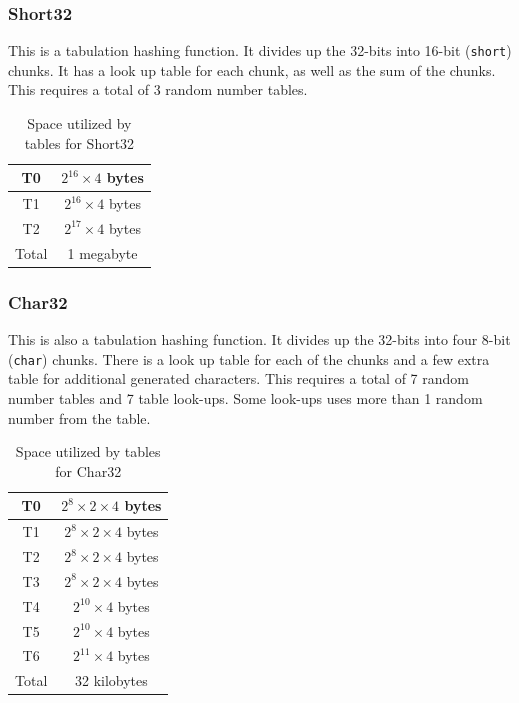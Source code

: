 \documentclass[11pt]{article}
\begin{document}
\subsubsection{Short32}
This is a tabulation hashing function. It divides up the 32-bits into 16-bit (\texttt{short}) chunks. 
It has a look up table for each chunk, as well as the sum of the chunks.  
This requires a total of 3 random number tables. 

\begin{table}
\centering 
\begin{tabular}{|c|c|}
  \hline
T0 & $2^{16}\times4$ bytes\\  \hline
T1 & $2^{16}\times4$ bytes\\ \hline
T2 & $2^{17}\times4$ bytes\\
  \hline \hline
  Total & 1 megabyte \\
  \hline
\end{tabular}
\caption{Space utilized by tables for Short32}
\label{tab:short32mem}
\end{table}

\subsubsection{Char32}
This is also a tabulation hashing function. It divides up the 32-bits into 
four 8-bit (\texttt{char}) chunks. There is a look up table for each of the
chunks and a few extra table for additional generated characters. 
This requires a total of 7 random number tables and 7 table look-ups. 
Some look-ups uses more than 1 random number from the table.

\begin{table}
\centering 
\begin{tabular}{|c|c|}
  \hline
T0 & $2^{8}\times 2 \times4$ bytes\\  \hline
T1 & $2^{8}\times 2 \times4$ bytes\\ \hline
T2 & $2^{8}\times 2 \times4$ bytes\\  \hline
T3 & $2^{8}\times 2 \times4$ bytes\\ \hline
T4 & $2^{10}\times4$ bytes\\  \hline
T5 & $2^{10}\times4$ bytes\\ \hline
T6 & $2^{11}\times4$ bytes\\
  \hline \hline
  Total & 32 kilobytes \\
  \hline
\end{tabular}
\caption{Space utilized by tables for Char32}
\label{tab:char32mem}
\end{table}
\end{document}
